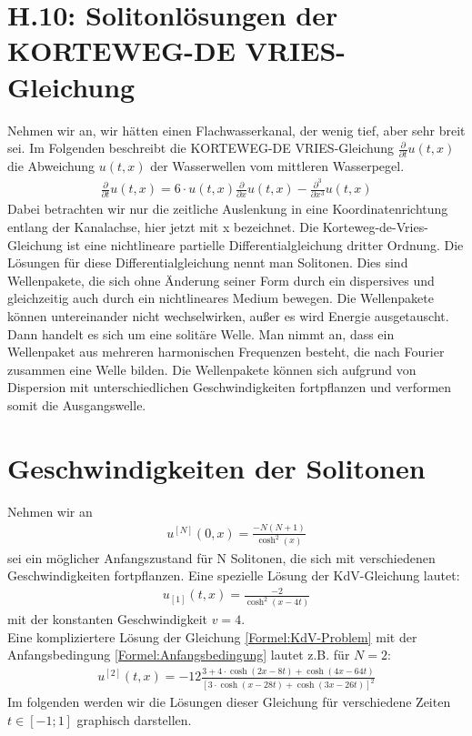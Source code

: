 \documentclass[ngerman]{scrartcl}
\begin{document}
\thispagestyle{fancy}
\section*{H.10: Solitonlösungen der KORTEWEG-DE VRIES-Gleichung}
Nehmen wir an, wir hätten einen Flachwasserkanal, der wenig tief, aber sehr breit sei. Im Folgenden beschreibt die KORTEWEG-DE VRIES-Gleichung $\frac{\partial}{\partial t}u(t,x)$ die Abweichung $u(t,x)$ der Wasserwellen vom mittleren Wasserpegel. 
\begin{align}
\frac{\partial}{\partial t}u(t,x) = 6 \cdot u(t,x) \frac{\partial}{\partial x}u(t,x) - \frac{\partial^3}{\partial x^3} u(t,x)
\label{Formel:KdV-Problem}
\end{align}
Dabei betrachten wir nur die zeitliche Auslenkung in eine Koordinatenrichtung entlang der Kanalachse, hier jetzt mit x bezeichnet. \newline
Die Korteweg-de-Vries-Gleichung ist eine nichtlineare partielle Differentialgleichung dritter Ordnung. \newline
Die Lösungen für diese Differentialgleichung nennt man Solitonen. Dies sind Wellenpakete, die sich ohne Änderung seiner Form durch ein dispersives und gleichzeitig auch durch ein nichtlineares Medium bewegen. Die Wellenpakete können untereinander nicht wechselwirken, außer es wird Energie ausgetauscht. Dann handelt es sich um eine solitäre Welle. \newline Man nimmt an, dass ein Wellenpaket aus mehreren harmonischen Frequenzen besteht, die nach Fourier zusammen eine Welle bilden. Die Wellenpakete können sich aufgrund von Dispersion mit unterschiedlichen Geschwindigkeiten fortpflanzen und verformen somit die Ausgangswelle. 
\section{Geschwindigkeiten der Solitonen}
Nehmen wir an 
\begin{align}
u^{[N]}(0,x) = \frac{-N (N+1)}{\cosh^2(x)}
\label{Formel:Anfangsbedingung}
\end{align}
sei ein möglicher Anfangszustand für N Solitonen, die sich mit verschiedenen Geschwindigkeiten fortpflanzen. Eine spezielle Lösung der KdV-Gleichung lautet:
\begin{align}
u_{[1]}(t,x) = \frac{-2}{\cosh^2(x-4t)}
\end{align} mit der konstanten Geschwindigkeit $v=4$. \\
Eine kompliziertere Lösung der Gleichung \ref{Formel:KdV-Problem} mit der Anfangsbedingung \ref{Formel:Anfangsbedingung} lautet z.B. für $N=2$:
\begin{align}
	u^{[2]}(t,x) = -12 \frac{3 + 4 \cdot \cosh(2x-8t) + \cosh(4x-64t)}{[3 \cdot \cosh(x-28t) + \cosh(3x-26t)]^2}
	\label{Formel:LösungFürNgleich2}
\end{align}
Im folgenden werden wir die Lösungen dieser Gleichung für verschiedene Zeiten $t \in [-1;1]$ graphisch darstellen. 
\end{document}
